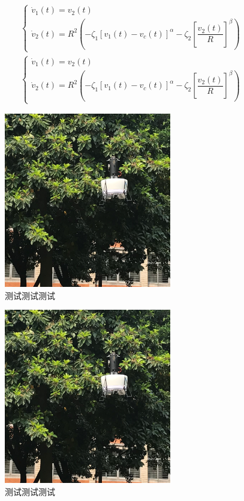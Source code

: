 \begin{align}
\left\{\begin{array}{l}
\dot{v}_{1}(t)=v_{2}(t) \\
\dot{v}_{2}(t)=R^{2}\left(-\zeta_{1}\left[v_{1}(t)-v_c(t)\right]^{\alpha}-\zeta_{2}\left[\dfrac{v_{2}(t)}{R}\right]^{\beta}\right)
\end{array}\right.	
\end{align}
\begin{align}
\left\{\begin{array}{l}
\dot{v}_{1}(t)=v_{2}(t) \\
\dot{v}_{2}(t)=R^{2}\left(-\zeta_{1}\left[v_{1}(t)-v_c(t)\right]^{\alpha}-\zeta_{2}\left[\dfrac{v_{2}(t)}{R}\right]^{\beta}\right)
\end{array}\right.	
\end{align}
\begin{figure}[htbp]
	\centering	
	\includegraphics[scale=1]{Fig/DFUAV_f31.png}
	\caption{\label{fig_case1}测试测试测试}
\end{figure}
\begin{figure}[htbp]
	\centering	
	\includegraphics[scale=1]{Fig/DFUAV_f31.png}
	\caption{\label{fig_case2}测试测试测试}
\end{figure}
